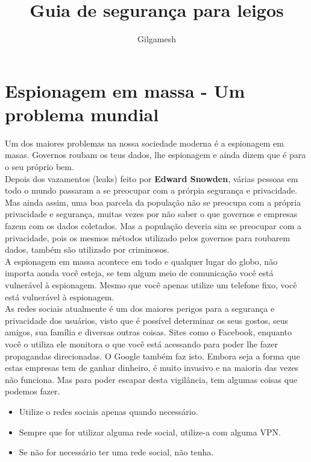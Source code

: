 \documentclass[12pt, letterpaper]{report}
\title{\Huge Guia de seguran\c{c}a para leigos}
\author{Gilgamesh}
\begin{document}
\maketitle
\pagebreak
\section*{Espionagem em massa - Um problema mundial}
\large Um dos maiores problemas na nossa sociedade moderna é a espionagem em masas. Governos roubam os teus dados, lhe espionagem e ainda dizem que é para o seu próprio bem.\\

	Depois dos vazamentos (leaks) feito por \textbf{Edward Snowden}, várias pessoas em todo o mundo passaram a se preocupar com a prórpia segurança e privacidade. Mas ainda assim, uma boa parcela da população não se preocupa com a própria privacidade e segurança, muitas vezes por não saber o que governos e empresas fazem com os dados coletados. Mas a população deveria sim se  preocupar com a privacidade, pois os mesmos métodos utilizado pelos governos para roubarem dados, também são utilizado por criminosos.\\

	A espionagem em massa acontece em todo e qualquer lugar do globo, não importa aonda você esteja, se tem algum meio de comunicação você está vulnerável à espionagem. Mesmo que você apenas utilize um telefone fixo, você está vulnerável à espionagem.\\

	As redes sociais atualmente é um dos maiores perigos para a segurança e privacidade dos usuários, visto que é possível determinar os seus gostos, seus amigos, sua família e diversas outras coisas. Sites como o Facebook, enquanto você o utiliza ele monitora o que você está acessando para poder lhe fazer propagandas direcionadas. O Google também faz isto. Embora seja a forma que estas empresas tem de ganhar dinheiro, é muito invasivo e na maioria das vezes não funciona. Mas para poder escapar desta vigilância, tem algumas coisas que podemos fazer.\\
	\begin{itemize}
		\item Utilize o redes sociais apenas quando necessário.
		\item Sempre que for utilizar alguma rede social, utilize-a com alguma VPN.
		\item Se não for necessário ter uma rede social, não tenha.
	\end{itemize}
\pagebreak
\end{document}
